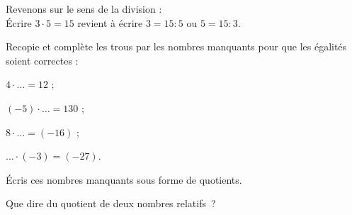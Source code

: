 
\begin{activite}

Revenons sur le sens de la division : \\[0.5em]
Écrire $3 \cdot 5 = 15$ revient à écrire $3 = 15 : 5$ ou $5 = 15 : 3$.
       
\begin{partie}
Recopie et complète les trous par les nombres manquants pour que les égalités soient correctes :
\begin{colenumerate}{4}
 \item $4 \cdot  \ldots = 12$ ;
 \item $(- 5) \cdot  \ldots = 130$ ;
 \item $8 \cdot  \ldots = (- 16)$ ;
 \item $ \ldots \cdot (- 3) = (- 27)$.
 \end{colenumerate}
\end{partie}

\begin{partie}
Écris ces nombres manquants sous forme de quotients.
\end{partie}

\begin{partie}
Que dire du quotient de deux nombres relatifs ?
\end{partie}

\end{activite}

